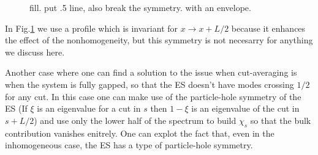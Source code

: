 \documentclass[twocolumn,amsmath,longbibliography,amssymb,superscriptaddress]{revtex4-1}
\begin{document}
\begin{figure}[h!]
\centering
{}\hspace{0mm}



\caption{ fill. put .5 line, also break the symmetry. with an envelope.}
\label{4}
\end{figure}

In Fig.\ref{4} we use a profile which is invariant for $x\rightarrow x+L/2$ because it enhances the effect of the nonhomogeneity, but this symmetry is not necesarry for anything we discuss here.

Another case where one can find a solution to the issue when cut-averaging is when the system is fully gapped, so that the ES doesn't have modes crossing $1/2$ for any cut. In this case one can make use of the particle-hole symmetry of the ES (If $\xi$ is an eigenvalue for a cut in $s$ then $1-\xi$ is an eigenvalue of the cut in $s+L/2$) and use only the lower half of the spectrum to build $\chi_s$ so that the bulk contribution vanishes enitrely. 
One can explot the fact that, even in the inhomogeneous case, the ES has a type of particle-hole symmetry. 
\end{document}
